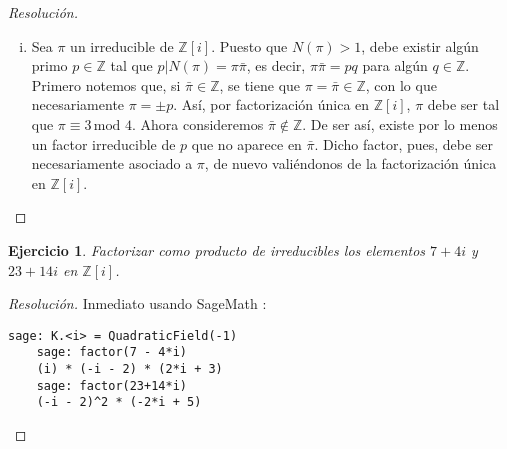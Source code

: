 \documentclass[a4paper,11pt]{article}
\newcommand{\ZZ}{\ensuremath{\mathbb{Z}}}
\newcommand{\Zm}[1]{\ensuremath{\mathbb{Z}[#1]}}
\newcommand{\Cong}[3]{\ensuremath{#1 \equiv #2 \, \textrm{mod } #3}}
\newcommand{\Div}[2]{\ensuremath{#1 | #2}}
\newtheorem*{ej}{Ejercicio}
\begin{document}
\begin{proof}[Resoluci\'on]
\begin{enumerate}[i.]
    \item Sea $\pi$ un irreducible de \Zm{i}. Puesto que $N(\pi) > 1$, debe existir algún
    primo $p \in \ZZ$ tal que $\Div{p}{N(\pi) = \pi \bar{\pi}}$, es decir, 
    $\pi \bar{\pi} = p q$ para algún $q \in \ZZ$. Primero notemos que, si $\bar{\pi} \in \ZZ$,
    se tiene que $\pi = \bar{\pi} \in \ZZ$, con lo que necesariamente $\pi = \pm p$. Así,
    por factorización única en \Zm{i}, $\pi$ debe ser tal que \Cong{\pi}{3}{4}.
    Ahora consideremos $\bar{\pi} \not\in \ZZ$. De ser
    así, existe por lo menos un factor irreducible de $p$ que no aparece en $\bar{\pi}$.
    Dicho factor, pues, debe ser necesariamente asociado a $\pi$, de nuevo valiéndonos de la
    factorización única en \Zm{i}.

\end{enumerate}

\end{proof}

\begin{ej} 
Factorizar como producto de irreducibles los elementos $7 + 4i$ y $23 + 14i$ en \Zm{i}.
\end{ej}

\begin{proof}[Resoluci\'on]
Inmediato usando SageMath \smiley:

\begin{center}
\begin{minipage}{6.8cm}
    \begin{Verbatim}[frame=single,fontsize=\footnotesize]
    sage: K.<i> = QuadraticField(-1)
    sage: factor(7 - 4*i)
    (i) * (-i - 2) * (2*i + 3)
    sage: factor(23+14*i)
    (-i - 2)^2 * (-2*i + 5)    
    \end{Verbatim}
\end{minipage}
  \end{center}

\end{proof}
\end{document}
